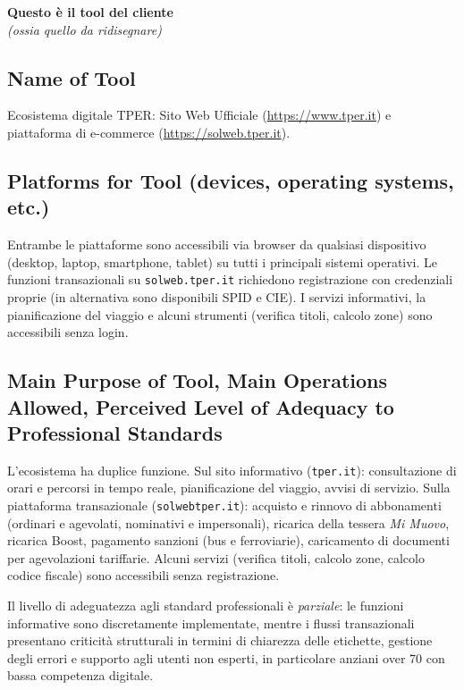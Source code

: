 ﻿\documentclass[11pt,a4paper]{article}
\begin{document}
\textbf{Questo è il tool del cliente}\\
\textit{(ossia quello da ridisegnare)}

\bigskip

\subsection*{Name of Tool}

\noindent Ecosistema digitale TPER: Sito Web Ufficiale (\url{https://www.tper.it})
e piattaforma di e-commerce (\url{https://solweb.tper.it}).

\subsection*{Platforms for Tool (devices, operating systems, etc.)}

\noindent Entrambe le piattaforme sono accessibili via browser da qualsiasi
dispositivo (desktop, laptop, smartphone, tablet) su tutti i principali
sistemi operativi. Le funzioni transazionali su \texttt{solweb.tper.it}
richiedono registrazione con credenziali proprie (in alternativa sono
disponibili SPID e CIE). I servizi informativi, la pianificazione del
viaggio e alcuni strumenti (verifica titoli, calcolo zone) sono
accessibili senza login.

{\raggedright\subsection*{Main Purpose of Tool, Main Operations Allowed, Perceived Level of Adequacy to Professional Standards}\par}

\noindent L'ecosistema ha duplice funzione. Sul sito informativo
(\texttt{tper.it}): consultazione di orari e percorsi in tempo reale,
pianificazione del viaggio, avvisi di servizio. Sulla piattaforma
transazionale (\texttt{solweb}\texttt{tper.it}): acquisto e rinnovo di abbonamenti
(ordinari e agevolati, nominativi e impersonali), ricarica della tessera
\textit{Mi Muovo}, ricarica Boost, pagamento sanzioni (bus e ferroviarie),
caricamento di documenti per agevolazioni tariffarie. Alcuni servizi
(verifica titoli, calcolo zone, calcolo codice fiscale) sono accessibili
senza registrazione.

\noindent Il livello di adeguatezza agli standard professionali è
\textit{parziale}: le funzioni informative sono discretamente implementate,
mentre i flussi transazionali presentano criticità strutturali in termini
di chiarezza delle etichette, gestione degli errori e supporto agli utenti
non esperti, in particolare anziani over 70 con bassa competenza digitale.
\end{document}
